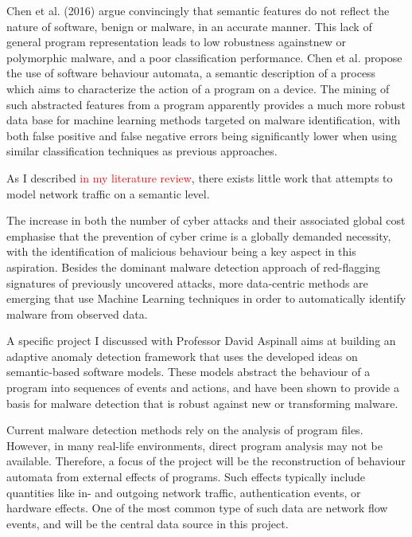 \documentclass[a4paper,12pt,twoside]{report}
\begin{document}
Chen et al.  (2016) \cite{chen2016robust, chen2016more} argue convincingly that
semantic features do not reflect the nature of software, benign or malware, in an accurate manner. This lack of general program representation leads to low robustness againstnew or polymorphic malware, and a poor classification performance.  Chen
et al. \cite{chen2016robust, chen2016more} propose the use of software behaviour automata, a semantic description of a process which aims to characterize the action of a program on a device. The mining of such abstracted features from a program apparently provides a much more robust data base for machine learning methods targeted on malware identification, with both false positive and false negative errors being significantly lower when using similar classification techniques as previous approaches.


As I described \textcolor{red}{in my literature review}, there exists little work that attempts to model network traffic on a semantic level. 



The increase in both the number of cyber attacks and their associated global cost emphasise that the prevention of cyber crime is a globally demanded necessity, with the identification of malicious behaviour being a key aspect in this aspiration. Besides the dominant malware detection approach of red-flagging signatures of previously uncovered attacks, more data-centric methods are emerging that use Machine Learning techniques in order to automatically identify malware from observed data.%

A specific project I discussed with Professor David Aspinall aims at building an adaptive anomaly detection framework that uses the developed ideas on semantic-based software models. These models abstract the behaviour of a program into sequences  of  events and  actions, and have been shown to provide a  basis for malware detection that is robust against new or transforming malware.

Current malware detection methods rely on the analysis of program files. However, in many real-life environments, direct program analysis may not be available. Therefore, a focus of the project will be the reconstruction of behaviour automata from external effects of programs. Such effects typically include quantities like in- and outgoing network traffic, authentication events, or hardware effects. One of the most common type of such data are network flow events, and will be the central data source in this project.
\end{document}

